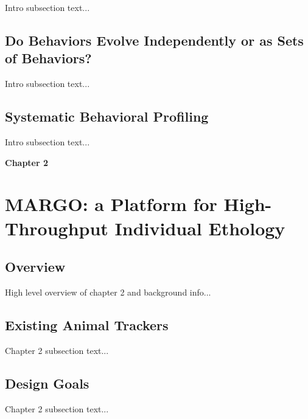 \documentclass[12pt,letterpaper]{article}
\begin{document}
Intro subsection text...

\subsection{Do Behaviors Evolve Independently or as Sets of Behaviors?}

Intro subsection text...

\subsection{Systematic Behavioral Profiling}

Intro subsection text...

\clearpage
\begin{center}
    \Large\textbf{Chapter 2}
    \thispagestyle{empty}       %
    \clearpage
\end{center}

\section{MARGO: a Platform for High-Throughput Individual Ethology}

\subsection{Overview}

High level overview of chapter 2 and background info...

\subsection{Existing Animal Trackers}

Chapter 2 subsection text...

\subsection{Design Goals}

Chapter 2 subsection text...
\end{document}
